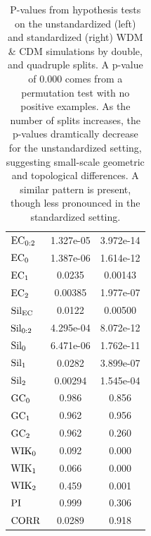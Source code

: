 \documentclass[12pt]{article}
\begin{document}
\begin{table}[htp!]
\begin{center}
\begin{tabular}{ l | c |  c }
          $\textup{EC}_{0:2}$ & 1.327e-05 &  3.972e-14 \\
          $\textup{EC}_{0}$ & 1.387e-06 & 1.614e-12 \\
          $\textup{EC}_{1}$ & 0.0235 & 0.00143 \\
          $\textup{EC}_{2}$ & 0.00385 & 1.977e-07 \\
          \midrule
          $\textup{Sil}_{\textup{EC}}$ & 0.0122 & 0.00500 \\
          $\textup{Sil}_{0:2}$ & 4.295e-04 & 8.072e-12 \\
          $\textup{Sil}_{0}$ & 6.471e-06 & 1.762e-11 \\
          $\textup{Sil}_{1}$ & 0.0282 & 3.899e-07 \\
          $\textup{Sil}_{2}$ & 0.00294 & 1.545e-04 \\
          \midrule
          $\textup{GC}_{0}$ & 0.986 & 0.856 \\
          $\textup{GC}_{1}$ & 0.962 & 0.956 \\
          $\textup{GC}_{2}$ & 0.962 & 0.260 \\
          \midrule
          $\textup{WIK}_{0}$ & 0.092 & 0.000 \\
          $\textup{WIK}_{1}$ & 0.066 & 0.000 \\
          $\textup{WIK}_{2}$ & 0.459 & 0.001 \\
          $\textup{PI}$ & 0.999 & 0.306 \\
          \midrule
          $\textup{CORR}$ & 0.0289 & 0.918 \\
          \bottomrule
        \end{tabular}
    \end{center}
\caption{P-values from hypothesis tests on the unstandardized (left) and standardized (right) WDM \& CDM simulations by double, and quadruple splits. A p-value of $0.000$ comes from a permutation test with no positive examples. As the number of splits increases, the p-values dramtically decrease for the unstandardized setting, suggesting small-scale geometric and topological differences. A similar pattern is present, though less pronounced in the standardized setting.}
\label{table:hypoCDMWDMresults}
\end{table}
\end{document}
